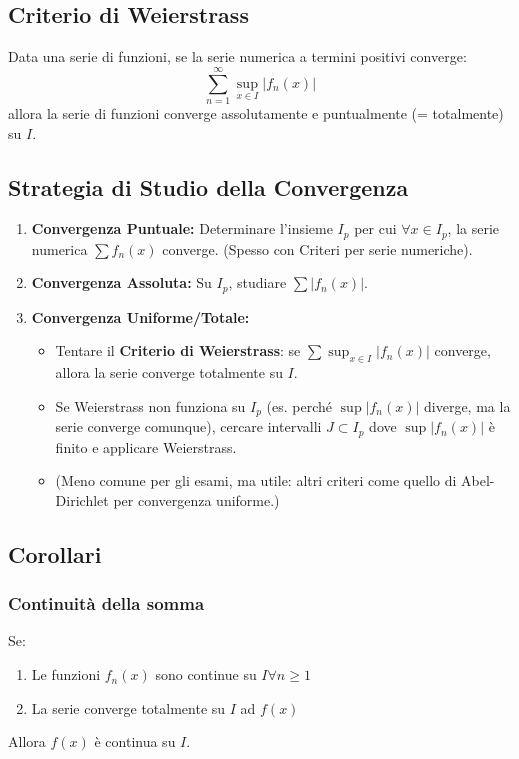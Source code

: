 \documentclass[10pt, a4paper]{article}
\begin{document}
    \subsection{Criterio di Weierstrass}
        Data una serie di funzioni, se la serie numerica a termini positivi converge:
        \begin{equation*}
            \sum_{n=1}^{\infty}\sup_{x\in I}\left|f_n(x)\right|
        \end{equation*}
        allora la serie di funzioni converge assolutamente e puntualmente (= totalmente) su $I$.
    \subsection{Strategia di Studio della Convergenza}
        \begin{enumerate}
            \item \textbf{Convergenza Puntuale:} Determinare l'insieme $I_p$ per cui $\forall x \in I_p$, la serie numerica $\sum f_n(x)$ converge. (Spesso con Criteri per serie numeriche).
            \item \textbf{Convergenza Assoluta:} Su $I_p$, studiare $\sum |f_n(x)|$.
            \item \textbf{Convergenza Uniforme/Totale:}
            \begin{itemize}
                \item Tentare il \textbf{Criterio di Weierstrass}: se $\sum \sup_{x \in I} |f_n(x)|$ converge, allora la serie converge totalmente su $I$.
                \item Se Weierstrass non funziona su $I_p$ (es. perché $\sup|f_n(x)|$ diverge, ma la serie converge comunque), cercare intervalli $J \subset I_p$ dove $\sup|f_n(x)|$ è finito e applicare Weierstrass.
                \item (Meno comune per gli esami, ma utile: altri criteri come quello di Abel-Dirichlet per convergenza uniforme.)
            \end{itemize}
        \end{enumerate}
    \subsection{Corollari}
        \subsubsection{Continuità della somma}
            Se:
            \begin{enumerate}
                \item Le funzioni $f_n(x)$ sono continue su $I\forall n\geq 1$
                \item La serie converge totalmente su $I$ ad $f(x)$  
            \end{enumerate}
            Allora $f(x)$ è continua su $I$.
\end{document}

